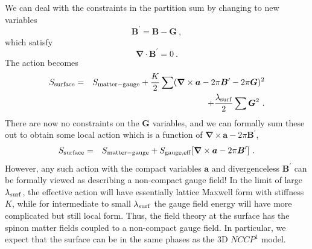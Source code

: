 \documentclass[prb,twocolumn]{revtex4-1}
\begin{document}
 We can deal with the constraints in the partition sum by changing to new variables
\begin{equation}
{\bm B}^\prime = {\bm B} - {\bm G} ~,
\end{equation}
which satisfy
\begin{equation}
{\bm \nabla} \cdot {\bm B}^\prime = 0 ~.
\end{equation}
The action becomes 
\begin{eqnarray*}
S_{\rm surface} &=& S_{\rm matter-gauge} + \frac{K}{2}\sum  ({\bm\nabla} \times {\bm a}  - 2\pi {\bm B}^\prime - 2\pi {\bm G})^2 \\
&& + \frac{\lambda_{\rm surf}}{2}\sum  {\bm G}^2 ~.
\end{eqnarray*}
There are now no constraints on the ${\bm G}$ variables, and we can formally sum these out to obtain some local action which is a function of ${\bm\nabla} \times {\bm a} - 2\pi {\bm B}^\prime$,
\begin{eqnarray*}
S_{\rm surface} &=& S_{\rm matter-gauge} + S_{\rm gauge, eff}[{\bm\nabla} \times {\bm a}  - 2\pi {\bm B}^\prime] ~.
\end{eqnarray*}
However, any such action with the compact variables ${\bm a}$ and divergenceless ${\bm B}^\prime$ can be formally viewed as describing a non-compact gauge field!  In the limit of large $\lambda_{\rm surf}$, the effective action will have essentially lattice Maxwell form with stiffness $K$, while for intermediate to small $\lambda_{\rm surf}$ the gauge field energy will have more complicated but still local form.  Thus, the field theory at the surface has the spinon matter fields coupled to a non-compact gauge field.  In particular, we expect that the surface can be in the same phases as the 3D $NCCP^1$ model.
\end{document}
